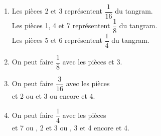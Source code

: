 \ \\ [-5mm]
   \begin{enumerate}
      \item Les pièces 2 et 3 représentent {\blue $\dfrac{1}{16}$} du tangram. \\ \smallskip
         Les pièces 1, 4 et 7 représentent {\blue $\dfrac18$} du tangram. \\ \smallskip
         Les pièces 5 et 6 représentent {\blue $\dfrac14$} du tangram. \medskip
      \item On peut faire $\dfrac18$ avec les pièces { et 3}. \medskip
      \item On peut faire $\dfrac{3}{16}$ avec les pièces \\ [1mm]
         { et 2} ou { et 3} ou encore { et 4}. \medskip
      \item On peut faire $\dfrac14$ avec les pièces \\ [1mm]
         { et 7} ou {, 2 et 3} ou {, 3 et 4} encore { et 4}.
   \end{enumerate}
